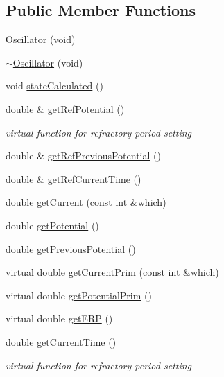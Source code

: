 \subsection*{Public Member Functions}
\begin{DoxyCompactItemize}
\item 
\hyperlink{class_oscillator_aad43fa7eeffdeb0cbc4767f2de538d80}{Oscillator} (void)
\item 
\hyperlink{class_oscillator_accb2f4ecc6604b2c38a7fd9973578360}{$\sim$\+Oscillator} (void)
\item 
void \hyperlink{class_oscillator_aaa37a3ba59f862e45025f93d8564474f}{state\+Calculated} ()
\item 
double \& \hyperlink{class_oscillator_a6d6d8ef3c022f6fd8c31c3e50987a822}{get\+Ref\+Potential} ()
\begin{DoxyCompactList}\small\item\em virtual function for refractory period setting \end{DoxyCompactList}\item 
double \& \hyperlink{class_oscillator_a734d7375586e9982a6419d1f08b63c57}{get\+Ref\+Previous\+Potential} ()
\item 
double \& \hyperlink{class_oscillator_ac82b2732257e64c0f84f5b520ef16704}{get\+Ref\+Current\+Time} ()
\item 
double \hyperlink{class_oscillator_a2dcfd98ad9d0c6e03cc07f84dd5f054a}{get\+Current} (const int \&which)
\item 
double \hyperlink{class_oscillator_a6ababfb0cb31e5dbf26b4d60a0d0bb16}{get\+Potential} ()
\item 
double \hyperlink{class_oscillator_a6272096989cb47a1cf43fd3aee78fdf5}{get\+Previous\+Potential} ()
\item 
virtual double \hyperlink{class_oscillator_a6132c7be8737a5686d64629b68b81743}{get\+Current\+Prim} (const int \&which)
\item 
virtual double \hyperlink{class_oscillator_a932fda2705d851fbe28c569547f4b4f1}{get\+Potential\+Prim} ()
\item 
virtual double \hyperlink{class_oscillator_ae81ca9a4404d59af1eaea0526cc3c88e}{get\+E\+R\+P} ()
\item 
double \hyperlink{class_oscillator_a6e403f6aa9e2cd9ff8aea1aefdb9459c}{get\+Current\+Time} ()
\begin{DoxyCompactList}\small\item\em virtual function for refractory period setting \end{DoxyCompactList}\item 

\end{DoxyCompactItemize}
